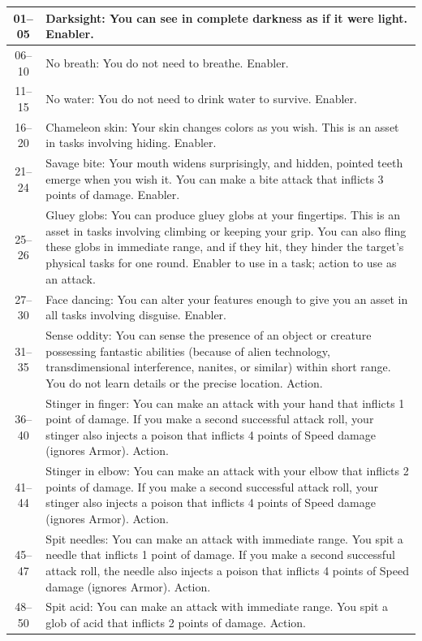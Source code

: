 \begin{longtable}{| c | p{15cm} |}
 01–05 & Darksight: You can see in complete darkness as if it were light. Enabler. \\ \hline
 06–10 & No breath: You do not need to breathe. Enabler. \\ \hline
 11–15 & No water: You do not need to drink water to survive. Enabler. \\ \hline
 16–20 & Chameleon skin: Your skin changes colors as you wish. This is an asset in tasks involving hiding. Enabler. \\ \hline
 21–24 & Savage bite: Your mouth widens surprisingly, and hidden, pointed teeth emerge when you wish it. You can make a bite attack that inflicts 3 points of damage. Enabler. \\ \hline
 25–26 & Gluey globs: You can produce gluey globs at your fingertips. This is an asset in tasks involving climbing or keeping your grip. You can also fling these globs in immediate range, and if they hit, they hinder the target’s physical tasks for one round. Enabler to use in a task; action to use as an attack. \\ \hline
 27–30 & Face dancing: You can alter your features enough to give you an asset in all tasks involving disguise. Enabler. \\ \hline
 31–35 & Sense oddity: You can sense the presence of an object or creature possessing fantastic abilities (because of alien technology, transdimensional interference, nanites, or similar) within short range. You do not learn details or the precise location. Action. \\ \hline
 36–40 & Stinger in finger: You can make an attack with your hand that inflicts 1 point of damage. If you make a second successful attack roll, your stinger also injects a poison that inflicts 4 points of Speed damage (ignores Armor). Action. \\ \hline
 41–44 & Stinger in elbow: You can make an attack with your elbow that inflicts 2 points of damage. If you make a second successful attack roll, your stinger also injects a poison that inflicts 4 points of Speed damage (ignores Armor). Action. \\ \hline
 45–47 & Spit needles: You can make an attack with immediate range. You spit a needle that inflicts 1 point of damage. If you make a second successful attack roll, the needle also injects a poison that inflicts 4 points of Speed damage (ignores Armor). Action. \\ \hline
 48–50 & Spit acid: You can make an attack with immediate range. You spit a glob of acid that inflicts 2 points of damage. Action. \\ \hline

\end{longtable}
